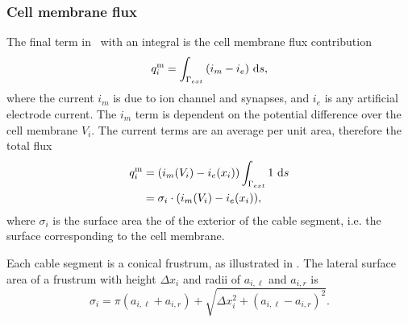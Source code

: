 \subsubsection{Cell membrane flux}
The final term in~ with an integral is the cell membrane flux contribution
\begin{equation}
    q_{i}^{\text{m}} = \int_{\Gamma_{ext}} {(i_m - i_e)} ~\text{d}{s},
\end{equation}
where the current $i_m$ is due to ion channel and synapses, and $i_e$ is any artificial electrode current.
The $i_m$ term is dependent on the potential difference over the cell membrane $V_i$.
The current terms are an average per unit area, therefore the total flux 
\begin{align}
    q_{i}^{\text{m}}
        & = (i_m(V_i) - i_e(x_i))\int_{\Gamma_{ext}} {1} ~\text{d}{s} \nonumber \\
        & = \sigma_i\cdot(i_m(V_i) - i_e(x_i)),
        \label{eq:q_im}
\end{align}
where $\sigma_i$ is the surface area the of the exterior of the cable segment, i.e. the surface corresponding to the cell membrane.

Each cable segment is a conical frustrum, as illustrated in .
The lateral surface area of a frustrum with height $\Delta x_i$ and radii of $a_{i,\ell}$ and $a_{i,r}$ is
\begin{equation}
    \sigma_i = \pi (a_{i,\ell} + a_{i,r})+\sqrt{\Delta x_i^2 + (a_{i,\ell} - a_{i,r})^2}.
    \label{eq:frustrum_volume}
\end{equation}

